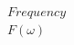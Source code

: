\documentclass[preview]{standalone}
\begin{document}
\begin{align*}
\begin{array}{c} Frequency \\ F(\omega) \end{array}
\end{align*}
\end{document}
